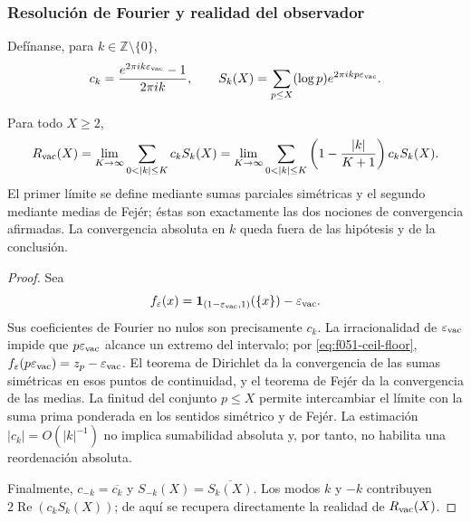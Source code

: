 \subsubsection{Resoluci\'on de Fourier y realidad del observador}

Def\'inanse, para \(k\in\mathbb Z\setminus\{0\}\),
\begin{equation}
 c_k=\frac{e^{2\pi i k\varepsilon_{\rm vac}}-1}{2\pi i k},
 \qquad
 S_k(X)=\sum_{p\leq X}(\log p)
             e^{2\pi i k p\varepsilon_{\rm vac}}.
 \label{eq:f051-fourier-data}
\end{equation}

\begin{proposition}
\label{prop:f051-fourier-resolution}
Para todo \(X\geq2\),
\begin{equation}
 R_{\rm vac}(X)
 =\lim_{K\to\infty}
   \sum_{0<|k|\leq K}c_kS_k(X)
 =\lim_{K\to\infty}
   \sum_{0<|k|\leq K}
   \left(1-\frac{|k|}{K+1}\right)c_kS_k(X).
 \label{eq:f051-fourier-pair}
\end{equation}
El primer l\'imite se define mediante sumas parciales sim\'etricas y el
segundo mediante medias de Fej\'er; éstas son exactamente las dos nociones
de convergencia afirmadas. La convergencia absoluta en \(k\) queda fuera
de las hip\'otesis y de la conclusi\'on.
\end{proposition}

\begin{proof}
Sea
\[
 f_{\varepsilon}(x)
 =\mathbf1_{(1-\varepsilon_{\rm vac},1)}(\{x\})
  -\varepsilon_{\rm vac}.
\]
Sus coeficientes de Fourier no nulos son precisamente \(c_k\). La
irracionalidad de \(\varepsilon_{\rm vac}\) impide que
\(p\varepsilon_{\rm vac}\) alcance un extremo del intervalo; por
\eqref{eq:f051-ceil-floor},
\(f_{\varepsilon}(p\varepsilon_{\rm vac})
 =z_p-\varepsilon_{\rm vac}\). El teorema de Dirichlet da la convergencia
de las sumas sim\'etricas en esos puntos de continuidad, y el teorema de
Fej\'er da la convergencia de las medias. La finitud del conjunto
\(p\leq X\) permite intercambiar el l\'imite con la suma prima ponderada en
los sentidos sim\'etrico y de Fej\'er. La estimaci\'on
\(|c_k|=O(|k|^{-1})\) no implica sumabilidad absoluta y, por tanto, no
habilita una reordenaci\'on absoluta.

Finalmente,
\(c_{-k}=\overline{c_k}\) y
\(S_{-k}(X)=\overline{S_k(X)}\). Los modos \(k\) y \(-k\) contribuyen
\(2\operatorname{Re}(c_kS_k(X))\); de aqu\'i se recupera directamente la
realidad de \(R_{\rm vac}(X)\).
\end{proof}

